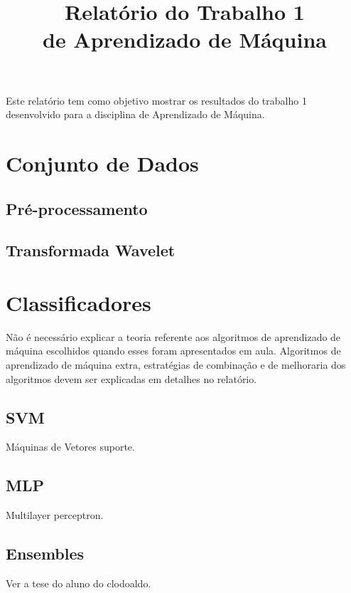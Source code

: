 \documentclass[conference]{IEEEtran}
\begin{document}
\title{Relatório do Trabalho 1\\ de Aprendizado de Máquina}

\author{
}

\maketitle


Este relatório tem como objetivo mostrar os resultados do trabalho 1 desenvolvido para a disciplina de Aprendizado de Máquina.


\section{Conjunto de Dados}

\subsection{Pré-processamento}

\subsection{Transformada Wavelet}

\section{Classificadores}
Não é necessário explicar a teoria referente aos algoritmos de aprendizado de máquina
escolhidos quando esses foram apresentados em aula. Algoritmos de aprendizado de máquina
extra, estratégias de combinação e de melhoraria dos algoritmos devem ser explicadas em
detalhes no relatório.

\subsection{SVM}
Máquinas de Vetores suporte.

\subsection{MLP}
Multilayer perceptron.

\subsection{Ensembles}
Ver a tese do aluno do clodoaldo.
\end{document}
